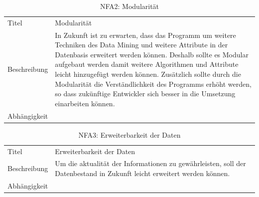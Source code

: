 \begin{table}[H] 
	\caption{NFA2: Modularität}
	\centering
	\label{fig:anforderungsanalyse:nichtfunktionaleanforderung:nfa2}
	\begin{tabular}{ | l | L{10cm} | } 
		\hline 
		 \\ \hline 
		Titel & Modularität \\ \hline 
		Beschreibung & In Zukunft ist zu erwarten, dass das Programm um weitere Techniken des Data Mining und weitere Attribute in der Datenbasis erweitert werden können. Deshalb sollte es Modular aufgebaut werden damit weitere Algorithmen und Attribute leicht hinzugefügt werden können. Zusätzlich sollte durch die Modularität die Verständlichkeit des Programms erhöht werden, so dass zukünftige Entwickler sich besser in die Umsetzung einarbeiten können. \\ \hline 
		Abhängigkeit & \\ \hline 
	\end{tabular}
\end{table}

\begin{table}[H] 
	\caption{NFA3: Erweiterbarkeit der Daten}
	\centering
	\label{fig:anforderungsanalyse:nichtfunktionaleanforderung:nfa3}
	\begin{tabular}{ | l | L{10cm} | } 
		\hline 
		 \\ \hline 
		Titel & Erweiterbarkeit der Daten \\ \hline 
		Beschreibung & Um die aktualität der Informationen zu gewährleisten, soll der Datenbestand in Zukunft leicht erweitert werden können. \\ \hline 
		Abhängigkeit & \\ \hline 
	\end{tabular}
\end{table}
 
